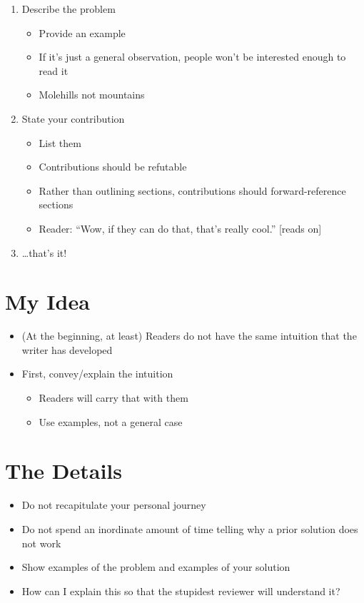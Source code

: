 \documentclass[11pt,a4paper]{article}
\begin{document}
\begin{enumerate}
\item Describe the problem
    \begin{itemize}
    \item Provide an example
    \item If it's just a general observation, people won't be interested enough to read it
    \item Molehills not mountains
    \end{itemize}
\item State your contribution
    \begin{itemize}
    \item List them
    \item Contributions should be refutable
    \item Rather than outlining sections, contributions should forward-reference sections
    \item Reader: ``Wow, if they can do that, that's really cool.'' [reads on]
    \end{itemize}
\item \dots that's it!
\end{enumerate}

\section{My Idea}

\begin{itemize}
\item (At the beginning, at least) Readers do not have the same intuition that the writer has developed
\item First, convey/explain the intuition
    \begin{itemize}
    \item Readers will carry that with them
    \item Use examples, not a general case
    \end{itemize}
\end{itemize}

\section{The Details}

\begin{itemize}
\item Do not recapitulate your personal journey
\item Do not spend an inordinate amount of time telling why a prior solution does not work
\item Show examples of the problem and examples of your solution
\item How can I explain this so that the stupidest reviewer will understand it?
\end{itemize}
\end{document}
